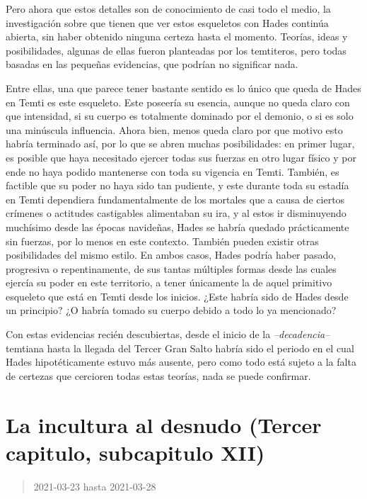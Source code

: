 \documentclass[
  spanish,
]{book}
\begin{document}
Pero ahora que estos detalles son de conocimiento de casi todo el medio, la investigación sobre que tienen que ver estos esqueletos con Hades continúa abierta, sin haber obtenido ninguna certeza hasta el momento. Teorías, ideas y posibilidades, algunas de ellas fueron planteadas por los temtiteros, pero todas basadas en las pequeñas evidencias, que podrían no significar nada.

Entre ellas, una que parece tener bastante sentido es lo único que queda de Hades en Temti es este esqueleto. Este poseería su esencia, aunque no queda claro con que intensidad, si su cuerpo es totalmente dominado por el demonio, o si es solo una minúscula influencia. Ahora bien, menos queda claro por que motivo esto habría terminado así, por lo que se abren muchas posibilidades: en primer lugar, es posible que haya necesitado ejercer todas sus fuerzas en otro lugar físico y por ende no haya podido mantenerse con toda su vigencia en Temti. También, es factible que su poder no haya sido tan pudiente, y este durante toda su estadía en Temti dependiera fundamentalmente de los mortales que a causa de ciertos crímenes o actitudes castigables alimentaban su ira, y al estos ir disminuyendo muchísimo desde las épocas navideñas, Hades se habría quedado prácticamente sin fuerzas, por lo menos en este contexto. También pueden existir otras posibilidades del mismo estilo.
En ambos casos, Hades podría haber pasado, progresiva o repentinamente, de sus tantas múltiples formas desde las cuales ejercía su poder en este territorio, a tener únicamente la de aquel primitivo esqueleto que está en Temti desde los inicios. ¿Este habría sido de Hades desde un principio? ¿O habría tomado su cuerpo debido a todo lo ya mencionado?

Con estas evidencias recién descubiertas, desde el inicio de la \emph{--decadencia--} temtiana hasta la llegada del Tercer Gran Salto habría sido el periodo en el cual Hades hipotéticamente estuvo más ausente, pero como todo está sujeto a la falta de certezas que cercioren todas estas teorías, nada se puede confirmar.

\hypertarget{la-incultura-al-desnudo-tercer-capitulo-subcapitulo-xii}{%
\section{La incultura al desnudo (Tercer capitulo, subcapitulo XII)}\label{la-incultura-al-desnudo-tercer-capitulo-subcapitulo-xii}}

\begin{quote}
2021-03-23 hasta 2021-03-28
\end{quote}
\end{document}
